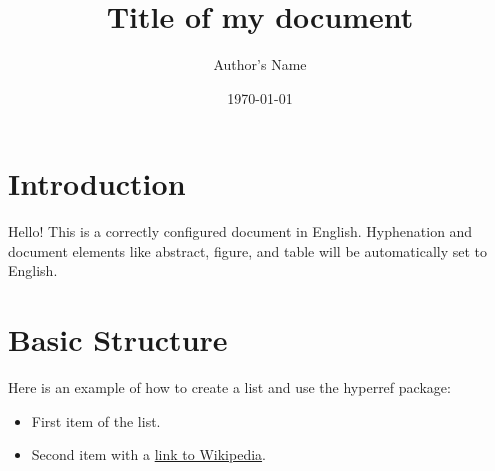 \documentclass[11pt,a4paper]{article}
\title{Title of my document}
\author{Author's Name}
\date{\today}
\begin{document}
\maketitle

\section{Introduction}
Hello! This is a correctly configured document in English. Hyphenation and document elements like abstract, figure, and table will be automatically set to English.

\section{Basic Structure}
Here is an example of how to create a list and use the hyperref package:

\begin{itemize}
    \item First item of the list.
    \item Second item with a \href{https://en.wikipedia.org}{link to Wikipedia}.
\end{itemize}
\end{document}
